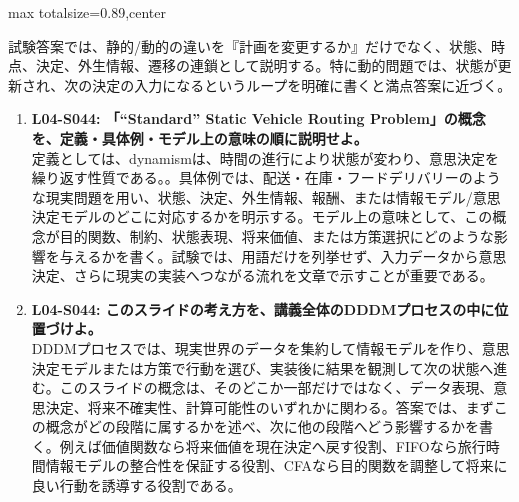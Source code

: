 \begin{minipage}[t]{0.58\textwidth}
\begin{adjustbox}{max totalsize={\textwidth}{0.89\textheight},center}
\begin{minipage}{\textwidth}
試験答案では、静的/動的の違いを『計画を変更するか』だけでなく、状態、時点、決定、外生情報、遷移の連鎖として説明する。特に動的問題では、状態が更新され、次の決定の入力になるというループを明確に書くと満点答案に近づく。\par{}\begin{enumerate}\item \textbf{L04-S044: 「“Standard” Static Vehicle Routing Problem」の概念を、定義・具体例・モデル上の意味の順に説明せよ。}\\定義としては、dynamismは、時間の進行により状態が変わり、意思決定を繰り返す性質である。。具体例では、配送・在庫・フードデリバリーのような現実問題を用い、状態、決定、外生情報、報酬、または情報モデル/意思決定モデルのどこに対応するかを明示する。モデル上の意味として、この概念が目的関数、制約、状態表現、将来価値、または方策選択にどのような影響を与えるかを書く。試験では、用語だけを列挙せず、入力データから意思決定、さらに現実の実装へつながる流れを文章で示すことが重要である。\item \textbf{L04-S044: このスライドの考え方を、講義全体のDDDMプロセスの中に位置づけよ。}\\DDDMプロセスでは、現実世界のデータを集約して情報モデルを作り、意思決定モデルまたは方策で行動を選び、実装後に結果を観測して次の状態へ進む。このスライドの概念は、そのどこか一部だけではなく、データ表現、意思決定、将来不確実性、計算可能性のいずれかに関わる。答案では、まずこの概念がどの段階に属するかを述べ、次に他の段階へどう影響するかを書く。例えば価値関数なら将来価値を現在決定へ戻す役割、FIFOなら旅行時間情報モデルの整合性を保証する役割、CFAなら目的関数を調整して将来に良い行動を誘導する役割である。\end{enumerate}
\end{minipage}
\end{adjustbox}
\end{minipage}


